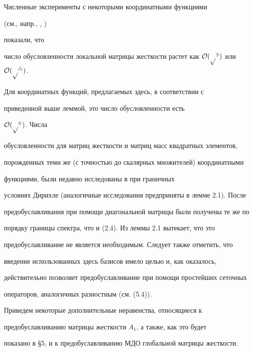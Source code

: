 \begin{notes}


Численные эксперименты с некоторыми координатными функциями


(см., напр., \cite{ba-cr-ma-pi}, \cite{ba-gr-pi})


показали, что


число обусловленности локальной матрицы жесткости растет как $\cal


O(p^3)$ или $\cal O(p^4)$.


Для координатных функций, предлагаемых здесь, в соответствии с 


приведенной выше леммой, это число обусловленности есть


$\cal O(p^2)$. Числа


обусловленности для матриц жесткости и матриц масс квадратных элементов,


порожденных теми же (с точностью до скалярных множителей) координатными


функциями, были недавно исследованы в \cite{mai-pou} при граничных


условиях Дирихле (аналогичные исследования предприняты в лемме 2.1). После


предобуславливания при помощи диагональной матрицы были получены те же по


порядку границы спектра, что и (2.4). Из леммы 2.1 вытекает, что это


предобуславливание не является необходимым. Следует также отметить, что


введение использованных здесь базисов имело целью и, как оказалось,


действительно позволяет предобуславливание при помощи простейших сеточных


операторов, аналогичных разностным (см. (5.4)).


\end{notes}





Приведем некоторые дополнительные неравенства, относящиеся к


предобуславливанию матрицы жесткости $A_1$, а также, как это будет


показано в \S5, и к предобуславливанию МДО глобальной матрицы жесткости.






